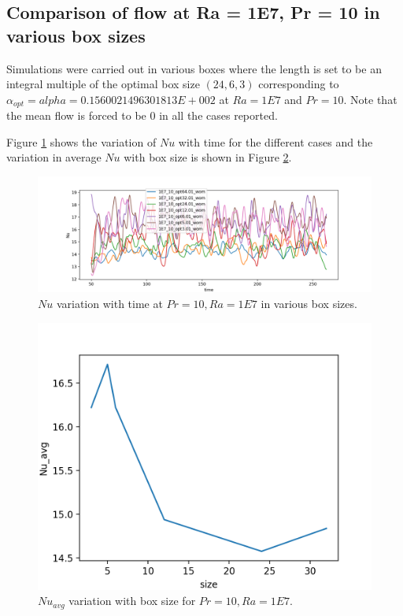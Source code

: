 \documentclass[12pt]{article}
\begin{document}
\subsection{Comparison of flow at Ra = 1E7, Pr = 10 in various box sizes}

Simulations were carried out in various boxes where the length is set to be an integral multiple of the optimal box size $(24, 6, 3)$ corresponding to $\alpha_{opt} = alpha = 0.1560021496301813E+002$ at $Ra = 1E7$ and $Pr = 10$. Note that the mean flow is forced to be 0 in all the cases reported.

Figure \ref{fig:fig16} shows the variation of $Nu$ with time for the different cases and the variation in average $Nu$ with box size is shown in Figure \ref{fig:fig17}. 

     \begin{figure}[!htb]
     	\includegraphics[width=\linewidth]{Nu_1E7_10.png}
     	\caption{$Nu$ variation with time at $Pr = 10, Ra = 1E7$ in various box sizes.}
     	\label{fig:fig16}
     \end{figure} 
     
     \begin{figure}[!htb]
     	\includegraphics[width=\linewidth]{Nu_avg_1E7_10.png}
     	\caption{$Nu_{avg}$ variation with box size for $Pr = 10, Ra = 1E7$.}
     	\label{fig:fig17}
     \end{figure} 
     
\end{document}
